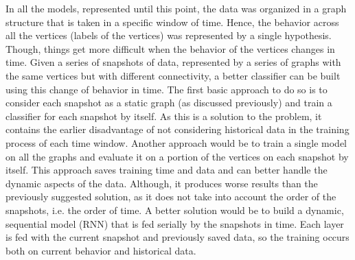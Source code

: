 In all the models, represented until this point, the data was organized in a graph structure that is taken in a specific window of time. Hence, the behavior across all the vertices (labels of the vertices) was represented by a single hypothesis.
Though, things get more difficult when the behavior of the vertices changes in time. Given a series of snapshots of data, represented by a series of graphs with the same vertices but with different connectivity, a better classifier can be built using this change of behavior in time.
The first basic approach to do so is to consider each snapshot as a static graph (as discussed previously) and train a classifier for each snapshot by itself. As this is a solution to the problem, it contains the earlier disadvantage of not considering historical data in the training process of each time window.
Another approach would be to train a single model on all the graphs and evaluate it on a portion of the vertices on each snapshot by itself. This approach saves training time and data and can better handle the dynamic aspects of the data. Although, it produces worse results than the previously suggested solution, as it does not take into account the order of the snapshots, i.e. the order of time.
A better solution would be to build a dynamic, sequential model (RNN) that is fed serially by the snapshots in time. Each layer is fed with the current snapshot and previously saved data, so the training occurs both on current behavior and historical data.

